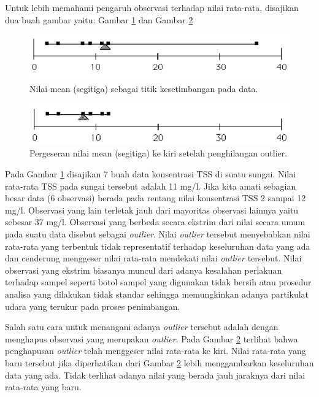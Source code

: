 \documentclass[]{book}
\begin{document}
Untuk lebih memahami pengaruh observasi terhadap nilai rata-rata,
disajikan dua buah gambar yaitu: Gambar \ref{fig:mean1} dan Gambar
\ref{fig:mean2}

\begin{figure}

{\centering \includegraphics[width=0.7\linewidth]{mean1} 

}

\caption{Nilai mean (segitiga) sebagai titik kesetimbangan pada data.}\label{fig:mean1}
\end{figure}

\begin{figure}

{\centering \includegraphics[width=0.7\linewidth]{mean2} 

}

\caption{Pergeseran nilai mean (segitiga) ke kiri setelah penghilangan outlier.}\label{fig:mean2}
\end{figure}

Pada Gambar \ref{fig:mean1} disajikan 7 buah data konsentrasi TSS di
suatu sungai. Nilai rata-rata TSS pada sungai tersebut adalah 11 mg/l.
Jika kita amati sebagian besar data (6 observasi) berada pada rentang
nilai konsentrasi TSS 2 sampai 12 mg/l. Observasi yang lain terletak
jauh dari mayoritas observasi lainnya yaitu sebesar 37 mg/l. Observasi
yang berbeda secara ekstrim dari nilai secara umum pada suatu data
disebut sebagai \emph{outlier}. Nilai \emph{outlier} tersebut
menyebabkan nilai rata-rata yang terbentuk tidak representatif terhadap
keseluruhan data yang ada dan cenderung menggeser nilai rata-rata
mendekati nilai \emph{outlier} tersebut. Nilai observasi yang ekstrim
biasanya muncul dari adanya kesalahan perlakuan terhadap sampel seperti
botol sampel yang digunakan tidak bersih atau prosedur analisa yang
dilakukan tidak standar sehingga memungkinkan adanya partikulat udara
yang terukur pada proses penimbangan.

Salah satu cara untuk menangani adanya \emph{outlier} tersebut adalah
dengan menghapus observasi yang merupakan \emph{outlier}. Pada Gambar
\ref{fig:mean2} terlihat bahwa penghapusan \emph{outlier} telah
menggeser nilai rata-rata ke kiri. Nilai rata-rata yang baru tersebut
jika diperhatikan dari Gambar \ref{fig:mean2} lebih menggambarkan
keseluruhan data yang ada. Tidak terlihat adanya nilai yang berada jauh
jaraknya dari nilai rata-rata yang baru.
\end{document}
